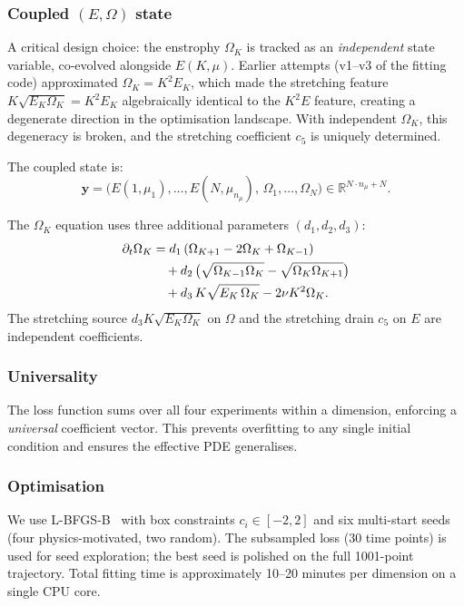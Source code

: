 \documentclass[11pt,a4paper]{article}
\theoremstyle{remark}
\newcommand{\R}{\mathbb{R}}
\begin{document}
\subsubsection{Coupled $(E, \Omega)$ state}

A critical design choice: the enstrophy $\Omega_K$ is tracked as an \emph{independent} state variable, co-evolved alongside $E(K,\mu)$.  Earlier attempts (v1--v3 of the fitting code) approximated $\Omega_K = K^2 E_K$, which made the stretching feature $K\sqrt{E_K \Omega_K} = K^2 E_K$ algebraically identical to the $K^2 E$ feature, creating a degenerate direction in the optimisation landscape.  With independent $\Omega_K$, this degeneracy is broken, and the stretching coefficient $c_5$ is uniquely determined.

The coupled state is:
\[
  \mathbf{y} = \bigl(E(1,\mu_1), \ldots, E(N, \mu_{n_\mu}), \,\Omega_1, \ldots, \Omega_N\bigr) \in \R^{N \cdot n_\mu + N}.
\]

The $\Omega_K$ equation uses three additional parameters $(d_1, d_2, d_3)$:
\begin{align}
  \partial_t \Omega_K &= d_1\,(\Omega_{K+1} - 2\Omega_K + \Omega_{K-1}) \notag \\
  &\quad + d_2\,\bigl(\sqrt{\Omega_{K-1}\Omega_K} - \sqrt{\Omega_K\Omega_{K+1}}\bigr) \notag \\
  &\quad + d_3\,K\sqrt{E_K\,\Omega_K} - 2\nu K^2 \Omega_K. \label{eq:omega-eqn}
\end{align}
The stretching source $d_3 K\sqrt{E_K\Omega_K}$ on $\Omega$ and the stretching drain $c_5$ on $E$ are independent coefficients.

\subsubsection{Universality}

The loss function sums over all four experiments within a dimension, enforcing a \emph{universal} coefficient vector.  This prevents overfitting to any single initial condition and ensures the effective PDE generalises.

\subsubsection{Optimisation}

We use L-BFGS-B~\cite{byrd1995} with box constraints $c_i \in [-2, 2]$ and six multi-start seeds (four physics-motivated, two random).  The subsampled loss (30 time points) is used for seed exploration; the best seed is polished on the full 1001-point trajectory.  Total fitting time is approximately 10--20 minutes per dimension on a single CPU core.
\end{document}
